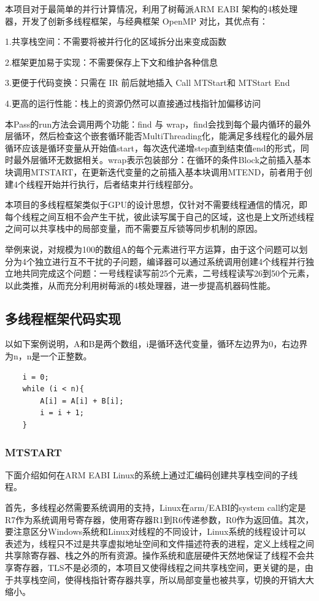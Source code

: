 本项目对于最简单的并行计算情况，利用了树莓派ARM EABI 架构的4核处理器，开发了创新多线程框架，与经典框架 OpenMP 对比，其优点有：

1.共享栈空间：不需要将被并行化的区域拆分出来变成函数

2.框架更加易于实现：不需要保存上下文和维护各种信息

3.更便于代码变换：只需在 IR 前后就地插入 Call MTStart和 MTStart End

4.更高的运行性能：栈上的资源仍然可以直接通过栈指针加偏移访问

本Pass的run方法会调用两个功能：find 与 wrap，find会找到每个最内循环的最外层循环，然后检查这个嵌套循环能否MultiThreading化，能满足多线程化的最外层循环应该是循环变量从开始值start，每次迭代递增step直到结束值end的形式，同时最外层循环无数据相关。wrap表示包装部分：在循环的条件Block之前插入基本块调用MTSTART，在更新迭代变量的之前插入基本块调用MTEND，前者用于创建4个线程开始并行执行，后者结束并行线程部分。

本项目的多线程框架类似于GPU的设计思想，仅针对不需要线程通信的情况，即每个线程之间互相不会产生干扰，彼此读写属于自己的区域，这也是上文所述线程之间可以共享栈中的局部变量，而不需要互斥锁等同步机制的原因。

举例来说，对规模为100的数组A的每个元素进行平方运算，由于这个问题可以划分为4个独立进行互不干扰的子问题，编译器可以通过系统调用创建4个线程并行独立地共同完成这个问题：一号线程读写前25个元素，二号线程读写26到50个元素，以此类推，从而充分利用树莓派的4核处理器，进一步提高机器码性能。

\subsection{多线程框架代码实现}
\label{anchor}

以如下案例说明，A和B是两个数组，i是循环迭代变量，循环左边界为0，右边界为n，n是一个正整数。
\begin{verbatim}
    i = 0;
    while (i < n){
	    A[i] = A[i] + B[i];
	    i = i + 1;
    }
\end{verbatim}


\subsubsection{MTSTART}

下面介绍如何在ARM EABI Linux的系统上通过汇编码创建共享栈空间的子线程。

首先，多线程必然需要系统调用的支持，Linux在arm/EABI的system call约定是R7作为系统调用号寄存器，使用寄存器R1到R6传递参数，R0作为返回值。其次，要注意区分Windows系统和Linux对线程的不同设计，Linux系统的线程设计可以表述为，线程只不过是共享虚拟地址空间和文件描述符表的进程，定义上线程之间共享除寄存器、栈之外的所有资源。操作系统和底层硬件天然地保证了线程不会共享寄存器，TLS不是必须的，本项目又使得线程之间共享栈空间，更关键的是，由于共享栈空间，使得栈指针寄存器共享，所以局部变量也被共享，切换的开销大大缩小。

